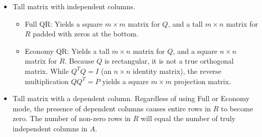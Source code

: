 \documentclass[../linear-algebra.tex]{subfiles}
\begin{document}
\begin{itemize}
    \item Tall matrix with independent columns.
    \begin{itemize}
        \item Full QR: Yields a square $m \times m$ matrix for $Q$, and a tall $m \times n$ matrix for $R$ padded with zeros at the bottom.
        \item Economy QR: Yields a tall $m \times n$ matrix for $Q$, and a square $n \times n$ matrix for $R$. Because $Q$ is rectangular, it is not a true orthogonal matrix. While $Q^T Q = I$ (an $n \times n$ identity matrix), the reverse multiplication $Q Q^T = P$ yields a square $m \times m$ projection matrix.
    \end{itemize}
    \item Tall matrix with a dependent column.
    Regardless of using Full or Economy mode, the presence of dependent columns causes entire rows in $R$ to become zero. The number of non-zero rows in $R$ will equal the number of truly independent columns in $A$.

\end{itemize}
\end{document}
